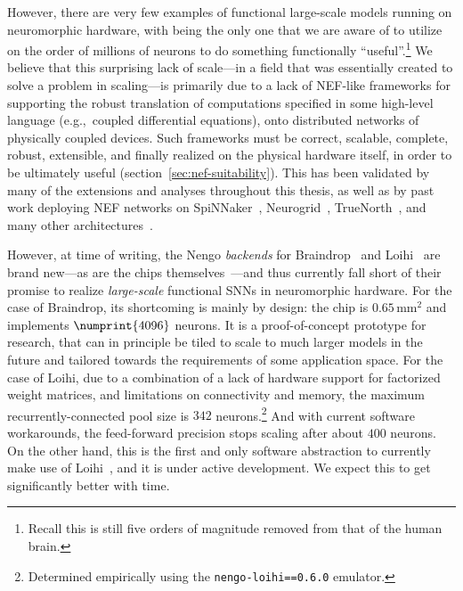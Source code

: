 However, there are very few examples of functional large-scale models running on neuromorphic hardware, with \citet{mundy2016real} being the only one that we are aware of to utilize on the order of millions of neurons to do something functionally ``useful''.\footnote{%
Recall this is still five orders of magnitude removed from that of the human brain.}
We believe that this surprising lack of scale---in a field that was essentially created to solve a problem in scaling---is primarily due to a lack of NEF-like frameworks for supporting the robust translation of computations specified in some high-level language (e.g.,~coupled differential equations), onto distributed networks of physically coupled devices.
Such frameworks must be correct, scalable, complete, robust, extensible, and finally realized on the physical hardware itself, in order to be ultimately useful (section~\ref{sec:nef-suitability}).
This has been validated by many of the extensions and analyses throughout this thesis, as well as by past work deploying NEF networks on
SpiNNaker~\citep{mundy2015},
Neurogrid~\citep{dethier2011brain},
TrueNorth~\citep{fischl2018},
and many other architectures~\citep{naylor2013managing, bekolay2014, corradi2014, wang2014compact, berzish2016, wang2017neuromorphic, rasmussen2018nengodl, blouw2018a}.

However, at time of writing, the Nengo \emph{backends} for Braindrop~\citep{braindrop2019} and Loihi~\citep{nengoloihi} are brand new---as are the chips themselves~\citep{neckar2018braindrop, davies2018loihi}---and thus currently fall short of their promise to realize \emph{large-scale} functional SNNs in neuromorphic hardware.
For the case of Braindrop, its shortcoming is mainly by design: the chip is $0.65$\,mm${}^2$ and implements $\numprint{4096}$ neurons.
It is a proof-of-concept prototype for research, that can in principle be tiled to scale to much larger models in the future and tailored towards the requirements of some application space.
For the case of Loihi, due to a combination of a lack of hardware support for factorized weight matrices, and limitations on connectivity and memory, the maximum recurrently-connected pool size is $342$ neurons.\footnote{Determined empirically using the \texttt{nengo-loihi==0.6.0} emulator.}
And with current software workarounds, the feed-forward precision stops scaling after about $400$ neurons.
On the other hand, this is the first and only software abstraction to currently make use of Loihi~\citep{blouw2018a}, and it is under active development.
We expect this to get significantly better with time.

